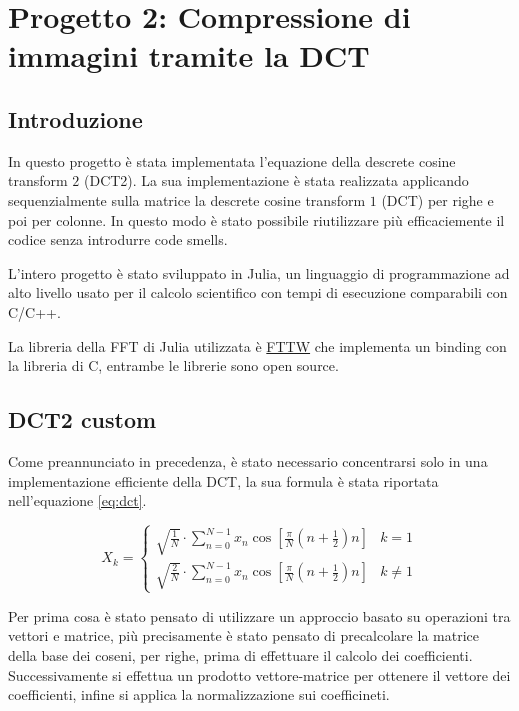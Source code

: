 \chapter{Progetto 2: Compressione di immagini tramite la DCT}

\section{Introduzione}
In questo progetto è stata implementata l'equazione della descrete cosine transform $2$ (DCT2).
La sua implementazione è stata realizzata applicando sequenzialmente sulla matrice 
la descrete cosine transform $1$ (DCT) per righe e poi per colonne. In questo modo 
è stato possibile riutilizzare più efficaciemente il codice senza introdurre code 
smells.

L'intero progetto è stato sviluppato in Julia, un linguaggio di programmazione ad 
alto livello usato per il calcolo scientifico con tempi di esecuzione comparabili 
con C/C++. 

La libreria della FFT di Julia utilizzata è \href{https://github.com/JuliaMath/FFTW.jl}{FTTW} 
che implementa un binding con la libreria di C, entrambe le librerie sono open source.
 
\section{DCT2 custom}
Come preannunciato in precedenza, è stato necessario concentrarsi solo in una implementazione 
efficiente della DCT, la sua formula è stata riportata nell'equazione \ref{eq:dct}. 

\begin{equation}
    X_k = \begin{cases}
        \sqrt{\frac{1}{N}}\cdot \sum_{n=0}^{N-1} x_n \cos\left[\frac{\pi}{N}\left(n + \frac{1}{2}\right) n \right] & k=1\\
        \sqrt{\frac{2}{N}}\cdot\sum _{n=0}^{N-1}x_{n}\cos \left[\frac{\pi}{N}\left(n+\frac{1}{2}\right)n\right] &  k \ne 1
\end{cases}
\label{eq:dct}
\end{equation}

Per prima cosa è stato pensato di utilizzare un approccio basato su operazioni 
tra vettori e matrice, più precisamente è stato pensato di precalcolare la matrice 
della base dei coseni, per righe, prima di effettuare il calcolo dei coefficienti.
Successivamente si effettua un prodotto vettore-matrice per ottenere il vettore 
dei coefficienti, infine si applica la normalizzazione sui coefficineti.

